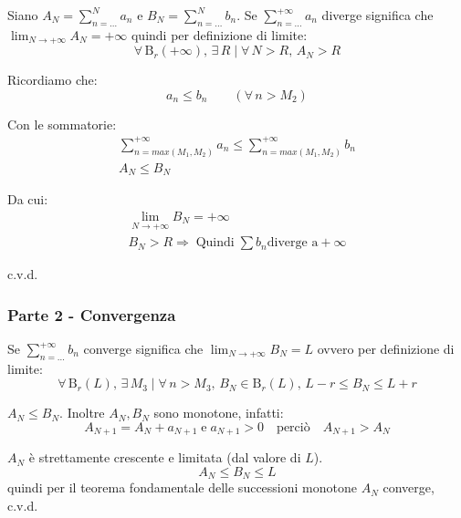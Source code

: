 \documentclass[../../dimostrazioni]{subfiles}
\begin{document}
                Siano \(A_N = \sum_{n=\dots}^{N} a_n\) e \(B_N = \sum_{n=\dots}^{N} b_n\). 
                Se \(\sum_{n=\dots}^{+\infty} a_n\) diverge significa che \(\lim_{N \to +\infty} A_N = +\infty\) 
                quindi per definizione di limite:
                \[\forall \, \mathrm{B}_r(+\infty), \, \exists \, R \mid \forall \, N > R, \, A_N > R\]

                Ricordiamo che:
                \[ a_n \leqslant b_n \qquad (\forall \, n > M_2) \]

                Con le sommatorie:
                \begin{gather*}
                    \sum_{n = max(M_1,M_2)}^{+\infty} a_n \leqslant \sum_{n = max(M_1,M_2)}^{+\infty} b_n\\
                    A_N \leqslant B_N
                \end{gather*}

                Da cui:
                \begin{gather*}  
                    \lim_{N \to +\infty} B_N = +\infty\\
                    B_N > R \Rightarrow \; \text{Quindi} \; \sum b_n \text{diverge a} +\infty
                \end{gather*}

                c.v.d.

            \subsubsection*{Parte 2 - Convergenza}

                Se \(\sum_{n=\dots}^{+\infty} b_n\) converge significa che \(   \lim_{N \to +\infty} B_N = L  \) ovvero per definizione di limite:
                \[  \forall \, \mathrm{B}_r(L), \, \exists \, M_3 \mid \forall \, n>M_3, \, B_N \in \mathrm{B}_r(L), \,  L-r \leqslant B_N \leqslant L + r   \]
                
                \(A_N \leqslant B_N\). Inoltre \(A_N, B_N\) sono monotone, infatti:
                \[  A_{N+1} = A_N + a_{N+1}\; \text{e} \; a_{N+1} > 0 \quad \text{perciò} \quad A_{N+1} > A_N\]

                \(A_N\) è strettamente crescente e limitata (dal valore di \(L\)).
                \[  A_N \leqslant B_N \leqslant L \]
                quindi per il teorema fondamentale delle successioni monotone \(A_N\) converge, c.v.d.
\end{document}
